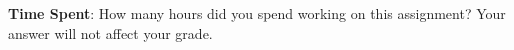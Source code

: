 \documentclass[12pt]{article}
\begin{document}
\vspace{2em}
\noindent\textbf{Time Spent}: How many hours did you spend working on this assignment? Your answer will not affect your grade.



\end{document}
